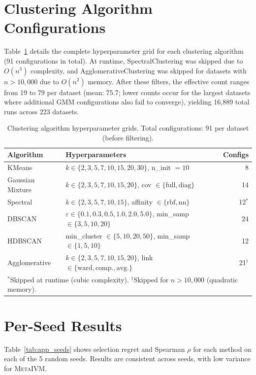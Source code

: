\documentclass[10pt]{article} %
\newcommand{\ours}{\textsc{MetaIVM}}
\begin{document}
\section{Clustering Algorithm Configurations}
\label{app:configs}

Table~\ref{tab:app_configs} details the complete hyperparameter grid for each clustering algorithm (91 configurations in total). At runtime, SpectralClustering was skipped due to $O(n^3)$ complexity, and AgglomerativeClustering was skipped for datasets with $n > 10{,}000$ due to $O(n^2)$ memory. After these filters, the effective count ranges from 19 to 79 per dataset (mean: 75.7; lower counts occur for the largest datasets where additional GMM configurations also fail to converge), yielding 16,889 total runs across 223 datasets.

\begin{table}[h]
\centering
\caption{Clustering algorithm hyperparameter grids. Total configurations: 91 per dataset (before filtering).}
\label{tab:app_configs}
\small
\begin{tabular}{llr}
\toprule
\textbf{Algorithm} & \textbf{Hyperparameters} & \textbf{Configs} \\
\midrule
KMeans & $k \in \{2,3,5,7,10,15,20,30\}$, n\_init $= 10$ & 8 \\
Gaussian Mixture & $k \in \{2,3,5,7,10,15,20\}$, cov $\in \{\text{full},\text{diag}\}$ & 14 \\
Spectral & $k \in \{2,3,5,7,10,15\}$, affinity $\in \{\text{rbf},\text{nn}\}$ & 12$^*$ \\
DBSCAN & $\varepsilon \in \{0.1,0.3,0.5,1.0,2.0,5.0\}$, min\_samp $\in \{3,5,10,20\}$ & 24 \\
HDBSCAN & min\_cluster $\in \{5,10,20,50\}$, min\_samp $\in \{1,5,10\}$ & 12 \\
Agglomerative & $k \in \{2,3,5,7,10,15,20\}$, link $\in \{\text{ward},\text{comp.},\text{avg.}\}$ & 21$^\dagger$ \\
\bottomrule
\multicolumn{3}{l}{\footnotesize $^*$Skipped at runtime (cubic complexity). $^\dagger$Skipped for $n > 10{,}000$ (quadratic memory).}
\end{tabular}
\end{table}


\section{Per-Seed Results}
\label{app:perseeds}

Table~\ref{tab:app_seeds} shows selection regret and Spearman $\rho$ for each method on each of the 5 random seeds. Results are consistent across seeds, with low variance for \ours{}.
\end{document}
